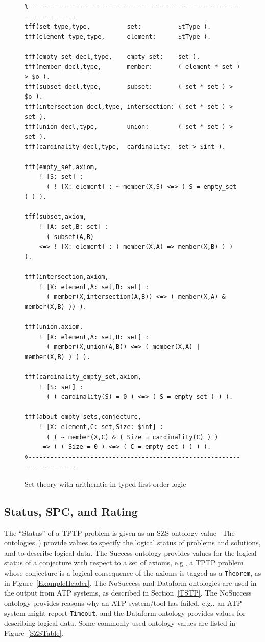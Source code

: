\documentclass[runningheads]{llncs}
\begin{document}
\begin{figure}[htb]
\centering
{\footnotesize
{\setlength{\baselineskip}{3mm}
\begin{verbatim}
%------------------------------------------------------------------------
tff(set_type,type,          set:          $tType ).
tff(element_type,type,      element:      $tType ).

tff(empty_set_decl,type,    empty_set:    set ).
tff(member_decl,type,       member:       ( element * set ) > $o ).
tff(subset_decl,type,       subset:       ( set * set ) > $o ).
tff(intersection_decl,type, intersection: ( set * set ) > set ).
tff(union_decl,type,        union:        ( set * set ) > set ).
tff(cardinality_decl,type,  cardinality:  set > $int ).

tff(empty_set,axiom,
    ! [S: set] :
      ( ! [X: element] : ~ member(X,S) <=> ( S = empty_set ) ) ).

tff(subset,axiom,
    ! [A: set,B: set] :
      ( subset(A,B)
    <=> ! [X: element] : ( member(X,A) => member(X,B) ) ) ).

tff(intersection,axiom,
    ! [X: element,A: set,B: set] :
      ( member(X,intersection(A,B)) <=> ( member(X,A) & member(X,B) )) ).

tff(union,axiom,
    ! [X: element,A: set,B: set] :
      ( member(X,union(A,B)) <=> ( member(X,A) | member(X,B) ) ) ).

tff(cardinality_empty_set,axiom,
    ! [S: set] :
      ( ( cardinality(S) = 0 ) <=> ( S = empty_set ) ) ).

tff(about_empty_sets,conjecture,
    ! [X: element,C: set,Size: $int] :
      ( ( ~ member(X,C) & ( Size = cardinality(C) ) )
     => ( ( Size = 0 ) <=> ( C = empty_set ) ) ) ).
%------------------------------------------------------------------------
\end{verbatim}
}}
\caption{Set theory with arithemtic in typed first-order logic}
\label{ExampleTF0}
\end{figure}

\subsection{Status, SPC, and Rating}
\label{Characteristics}

The ``Status'' of a TPTP problem is given as an SZS ontology value~\cite{Sut08-KEAPPA}
The ontologies~\cite{SZS03}) provide values to specify the logical status of problems and
solutions, and to describe logical data.
The Success ontology provides values for the logical status of a conjecture with respect to a 
set of axioms, e.g., a TPTP problem whose conjecture is a logical consequence of the axioms 
is tagged as a {\tt Theorem}, as in Figure~\ref{ExampleHeader}.
The NoSuccess and Dataform ontologies are used in the output from ATP systems, as described in
Section~\ref{TSTP}.
The NoSuccess ontology provides reasons why an ATP system/tool has failed, e.g., an ATP system 
might report {\tt Timeout}, and the Dataform ontology provides values for describing logical 
data.
Some commonly used ontology values are listed in Figure~\ref{SZSTable}.
\end{document}
